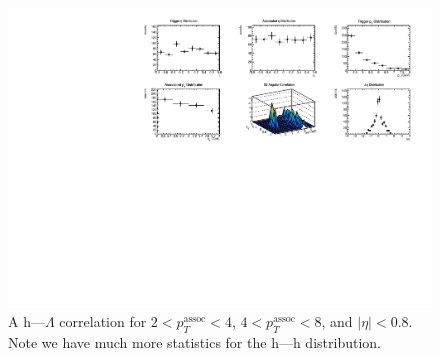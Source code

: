 \documentclass[../main.tex]{subfiles}
\begin{document}
\begin{figure}
    \centering
    \includegraphics[scale=0.9]{results/figs/hl08_projections.pdf}
    \caption{A h---$\Lambda$ correlation for $2 < p_T^{\text{assoc}} < 4$, $4<p_T^{\text{assoc}}<8$, and $|\eta|<0.8$. Note we have much more statistics for the h---h distribution.}
    \label{fig:hl08}
\end{figure}
\end{document}
